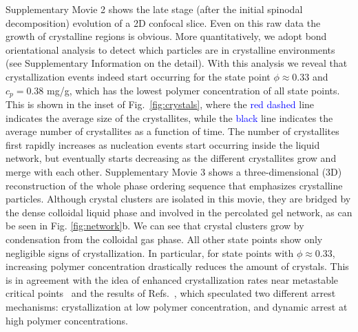 \documentclass[preprint,amsmath,amssymb,superscriptaddress]{revtex4-1}
\begin{document}
Supplementary Movie 2 shows the late stage (after the initial spinodal decomposition) evolution of a 2D confocal slice. Even on this raw data the growth of crystalline regions is obvious. More quantitatively, we adopt bond orientational analysis to detect which particles are in crystalline environments~\cite{russo2013interplay} 
(see Supplementary Information on the detail). 
With this analysis we reveal that crystallization events indeed start occurring for the state point $\phi\approx 0.33$ and $c_p=0.38$ mg/g, which has the lowest
polymer concentration of all state points. This is shown in the inset of Fig.~\ref{fig:crystals}, where the \textcolor{blue}{red dashed} line indicates the average size of the crystallites, 
while the \textcolor{blue}{black} line indicates the average number of crystallites as a function of time. The number of crystallites first rapidly increases as nucleation events
start occurring inside the liquid network, but eventually starts decreasing as the different crystallites grow and merge with each other.  Supplementary Movie 3 shows a three-dimensional (3D) reconstruction  of the whole phase ordering sequence that emphasizes crystalline particles. Although crystal clusters are isolated in this movie, they are bridged by the dense colloidal liquid phase and involved in the percolated gel network, as can be seen in Fig. \ref{fig:network}b. 
We can see that crystal clusters grow by condensation from the colloidal gas phase. 
All other state points show only negligible signs of crystallization. In particular, for state points with $\phi\approx 0.33$, increasing
polymer concentration drastically reduces the amount of crystals. This is in agreement with the
idea of enhanced crystallization rates near metastable critical points~\cite{ten1997enhancement,olmsted1998spinodal} and the
results of Refs.~\cite{soga1999metastable,fortini2008crystallization,perez2011pathways},
which speculated two different arrest mechanisms: crystallization at low polymer concentration, and dynamic arrest at high polymer concentrations.
\end{document}
